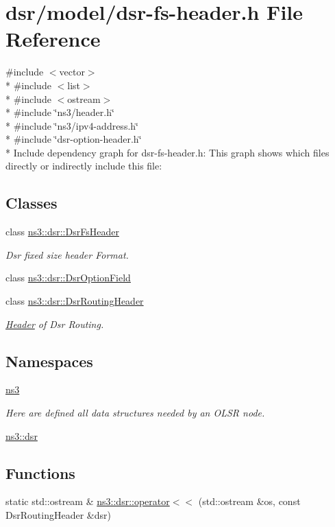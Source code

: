 \hypertarget{dsr-fs-header_8h}{}\section{dsr/model/dsr-\/fs-\/header.h File Reference}
\label{dsr-fs-header_8h}
{\ttfamily \#include $<$vector$>$}\\*
{\ttfamily \#include $<$list$>$}\\*
{\ttfamily \#include $<$ostream$>$}\\*
{\ttfamily \#include \char`\"{}ns3/header.\+h\char`\"{}}\\*
{\ttfamily \#include \char`\"{}ns3/ipv4-\/address.\+h\char`\"{}}\\*
{\ttfamily \#include \char`\"{}dsr-\/option-\/header.\+h\char`\"{}}\\*
Include dependency graph for dsr-\/fs-\/header.h\+:
This graph shows which files directly or indirectly include this file\+:
\subsection*{Classes}
\begin{DoxyCompactItemize}
\item 
class \hyperlink{classns3_1_1dsr_1_1DsrFsHeader}{ns3\+::dsr\+::\+Dsr\+Fs\+Header}
\begin{DoxyCompactList}\small\item\em Dsr fixed size header Format. \end{DoxyCompactList}\item 
class \hyperlink{classns3_1_1dsr_1_1DsrOptionField}{ns3\+::dsr\+::\+Dsr\+Option\+Field}
\item 
class \hyperlink{classns3_1_1dsr_1_1DsrRoutingHeader}{ns3\+::dsr\+::\+Dsr\+Routing\+Header}
\begin{DoxyCompactList}\small\item\em \hyperlink{classns3_1_1Header}{Header} of Dsr Routing. \end{DoxyCompactList}\end{DoxyCompactItemize}
\subsection*{Namespaces}
\begin{DoxyCompactItemize}
\item 
 \hyperlink{namespacens3}{ns3}
\begin{DoxyCompactList}\small\item\em Here are defined all data structures needed by an O\+L\+SR node. \end{DoxyCompactList}\item 
 \hyperlink{namespacens3_1_1dsr}{ns3\+::dsr}
\end{DoxyCompactItemize}
\subsection*{Functions}
\begin{DoxyCompactItemize}
\item 
static std\+::ostream \& \hyperlink{namespacens3_1_1dsr_a9dc67ae39788a83ff6e893c58e91d336}{ns3\+::dsr\+::operator$<$$<$} (std\+::ostream \&os, const Dsr\+Routing\+Header \&dsr)
\end{DoxyCompactItemize}
